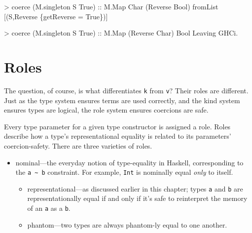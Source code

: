 \documentclass[
  11pt,
]{book}
\newenvironment{Shaded}{}{}
\newcommand{\CharTok}[1]{\textcolor[rgb]{0.25,0.44,0.63}{#1}}
\newcommand{\DataTypeTok}[1]{\textcolor[rgb]{0.56,0.13,0.00}{#1}}
\newcommand{\NormalTok}[1]{#1}
\newcommand{\OperatorTok}[1]{\textcolor[rgb]{0.40,0.40,0.40}{#1}}
\newcommand{\OtherTok}[1]{\textcolor[rgb]{0.00,0.44,0.13}{#1}}
\providecommand{\tightlist}{%
  \setlength{\itemsep}{0pt}\setlength{\parskip}{0pt}}
\theoremstyle{nonumberplain}
\begin{document}
\begin{Shaded}
\begin{Highlighting}[]
\OperatorTok{\textgreater{}}\NormalTok{ coerce (M.singleton }\CharTok{\textquotesingle{}S\textquotesingle{}} \DataTypeTok{True}\NormalTok{)}\OtherTok{ ::} \DataTypeTok{M.Map} \DataTypeTok{Char}\NormalTok{ (}\DataTypeTok{Reverse} \DataTypeTok{Bool}\NormalTok{)}
\NormalTok{fromList [(}\CharTok{\textquotesingle{}S\textquotesingle{}}\NormalTok{,}\DataTypeTok{Reverse}\NormalTok{ \{getReverse }\OtherTok{=} \DataTypeTok{True}\NormalTok{\})]}


\OperatorTok{\textgreater{}}\NormalTok{ coerce (M.singleton }\CharTok{\textquotesingle{}S\textquotesingle{}} \DataTypeTok{True}\NormalTok{)}\OtherTok{ ::} \DataTypeTok{M.Map}\NormalTok{ (}\DataTypeTok{Reverse} \DataTypeTok{Char}\NormalTok{) }\DataTypeTok{Bool}
\DataTypeTok{Leaving} \DataTypeTok{GHCi}\OperatorTok{.}
\end{Highlighting}
\end{Shaded}

\hypertarget{roles-1}{%
\section{Roles}\label{roles-1}}

The question, of course, is what differentiates \texttt{k} from
\texttt{v}? Their roles are different. Just as the type system ensures
terms are used correctly, and the kind system ensures types are logical,
the role system ensures coercions are safe.

Every type parameter for a given type constructor is assigned a role.
Roles describe how a type's representational equality is related to its
parameters' coercion-safety. There are three varieties of roles.

\begin{itemize}
\tightlist
\item
  nominal---the everyday notion of type-equality in Haskell,
  corresponding to the \texttt{a\ \textasciitilde{}\ b} constraint. For
  example, \texttt{Int} is nominally equal \emph{only} to itself.

  \begin{itemize}
  \tightlist
  \item
    representational---as discussed earlier in this chapter; types
    \texttt{a} and \texttt{b} are representationally equal if and only
    if it's safe to reinterpret the memory of an \texttt{a} as a
    \texttt{b}.
  \item
    phantom---two types are always phantom-ly equal to one another.
  \end{itemize}
\end{itemize}
\end{document}
